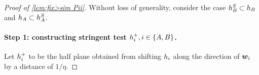 \begin{proof}[Proof of \cref{lem:fix>sim Pii}]

    Without loss of generality, consider the case $h_B^S\subset h_B$ and $h_A\subset h_A^S$.


    \paragraph{Step 1: constructing stringent test $h_i^{+}, i\in \{A,B\}$.}
    Let $h_i^{+}$ to be the half plane obtained from shifting $h_i$ along the direction of $\boldsymbol{w}_i$ by a distance of $1/\eta$.

   

    

\end{proof}

